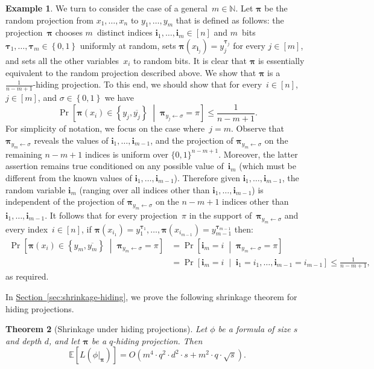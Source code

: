 \documentclass[11pt]{article}
\numberwithin{equation}{section}
\newtheorem{theorem}{Theorem}[section]
\theoremstyle{definition}
\newtheorem{example}[theorem]{Example}
\theoremstyle{plain}
\newcommand{\N}{\mathbb N}
\newcommand{\expref}[2]{\hyperref[#2]{#1~\ref{#2}}}
\theoremstyle{definition}\newtheorem{notation}[theorem]{Notation}\theoremstyle{plain}
\newcommand{\E}{\mathbb{E}}
\renewcommand{\N}{\mathbb{N}}
\newcommand{\B}{\left\{ 0,1 \right \}}
\newcommand{\p}{\boldsymbol{\pi}}
\newcommand{\btau}{\boldsymbol{\tau}}
\renewcommand{\i}{\boldsymbol{i}}
\theoremstyle{definition}
\theoremstyle{plain}
\begin{document}
\begin{example}
\label{ex:random-m-variables-alive}We turn to consider the case of a
general~$m\in\N$. Let $\p$ be the random projection from $x_{1},\ldots,x_{n}$
to $y_{1},\ldots,y_{m}$ that is defined as follows: the projection~$\p$
chooses $m$~distinct indices $\i_{1},\ldots,\i_{m}\in\left[n\right]$
and $m$~bits $\btau_{1},\ldots,\btau_{m}\in\B$ uniformly at random,
sets $\p(x_{\i_{j}})=y_{j}^{\btau_{j}}$ for every $j\in\left[m\right]$,
and sets all the other variables~$x_{i}$ to random bits. It is clear
that $\p$ is essentially equivalent to the random projection described
above. We show that $\p$ is a $\frac{1}{n-m+1}$-hiding projection.
To this end, we should show that for every~$i\in\left[n\right]$,
$j\in\left[m\right]$, and $\sigma\in\B$ we have 
\[
\Pr\!\left[\p(x_{i})\in\left\{ y_{j},\overline{y_{j}}\right\} \;\middle|\;\p_{y_{j}\gets\sigma}=\pi\right]\le\frac{1}{n-m+1}.
\]
For simplicity of notation, we focus on the case where~$j=m$. Observe
that $\p_{y_{m}\gets\sigma}$ reveals the values of $\i_{1},\ldots,\i_{m-1}$,
and the projection of $\p_{y_{m}\gets\sigma}$ on the remaining $n-m+1$
indices is uniform over $\{0,1\}^{n-m+1}$. Moreover, the latter assertion
remains true conditioned on any possible value of~$\i_{m}$ (which
must be different from the known values of $\i_{1},\ldots,\i_{m-1}$).
Therefore given $\i_{1},\ldots,\i_{m-1}$, the random variable $\i_{m}$
(ranging over all indices other than $\i_{1},\ldots,\i_{m-1}$) is
independent of the projection of $\p_{y_{m}\gets\sigma}$ on the $n-m+1$
indices other than $\i_{1},\ldots,\i_{m-1}$. It follows that for
every projection~$\pi$ in the support of~$\p_{y_{m}\gets\sigma}$
and every index~$i\in\left[n\right]$, if $\p(x_{i_{1}})=y_{1}^{\btau_{1}},\ldots,\p(x_{i_{m-1}})=y_{m-1}^{\btau_{m-1}}$
then: 
\begin{align*}
\Pr\!\left[\p(x_{i})\in\left\{ y_{m},\overline{y_{m}}\right\} \;\middle|\;\p_{y_{m}\gets\sigma}=\pi\right] & =\Pr\!\left[\i_{m}=i\;\middle|\;\p_{y_{m}\gets\sigma}=\pi\right]\\
 & =\Pr\!\left[\i_{m}=i\;\middle|\;\i_{1}=i_{1},\ldots,\i_{m-1}=i_{m-1}\right]\le\frac{1}{n-m+1},
\end{align*}
as required.
\end{example}

In \expref{Section}{sec:shrinkage-hiding}, we prove the following shrinkage theorem
for hiding projections. 
\begin{theorem}[Shrinkage under hiding projections]
\label{thm:shrinkage-hiding}Let $\phi$ be a formula of size $s$ and
depth $d$, and let $\p$ be a $q$-hiding projection. Then 
\[
\E\left[L(\phi|_{\p})\right]=O\!\left(m^{4}\cdot q^{2}\cdot d^{2}\cdot s+m^{2}\cdot q\cdot\sqrt{s}\right).
\]
\end{theorem}
\end{document}
